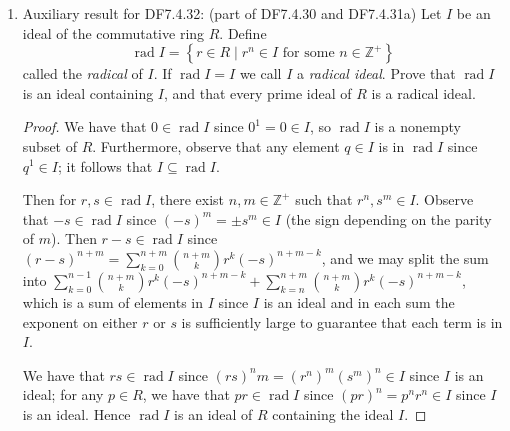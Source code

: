 \documentclass[11pt]{article}
\newcommand{\cbr}[1]{\left\{#1\right\}}
\DeclareMathOperator{\rad}{rad}
\begin{document}
\begin{enumerate}
    \item Auxiliary result for DF7.4.32: (part of DF7.4.30 and DF7.4.31a) Let $I$ be an ideal of the commutative ring $R$. Define \[\rad I = \cbr{r\in R\mid r^n\in I\text{ for some $n\in \mathbb{Z}^+$}}\] called the \textit{radical} of $I$. If $\rad I = I$ we call $I$ a \textit{radical ideal}. Prove that $\rad I$ is an ideal containing $I$, and that every prime ideal of $R$ is a radical ideal. 
    \begin{proof} We have that $0\in \rad I$ since $0^1 = 0\in I$, so $\rad I$ is a nonempty subset of $R$. Furthermore, observe that any element $q\in I$ is in $\rad I$ since $q^1 \in I$; it follows that $I\subseteq \rad I$.
      
    Then for $r,s\in \rad I$, there exist $n,m\in\mathbb{Z}^+$ such that $r^n, s^m\in I$. Observe that $-s\in\rad I$ since $(-s)^m = \pm s^m \in I$ (the sign depending on the parity of $m$). Then $r-s\in\rad I$ since $(r-s)^{n+m} = \sum_{k=0}^{n+m} \binom{n+m}{k}r^k(-s)^{n+m-k}$, and we may split the sum into $\sum_{k=0}^{n-1} \binom{n+m}{k}r^k(-s)^{n+m-k} + \sum_{k=n}^{n+m} \binom{n+m}{k}r^k(-s)^{n+m-k}$, which is a sum of elements in $I$ since $I$ is an ideal and in each sum the exponent on either $r$ or $s$ is sufficiently large to guarantee that each term is in $I$.
        
    We have that $rs\in \rad I$ since $(rs)^nm = (r^n)^m(s^m)^n \in I$ since $I$ is an ideal; for any $p\in R$, we have that $pr\in \rad I$ since $(pr)^n = p^n r^n \in I$ since $I$ is an ideal. Hence $\rad I$ is an ideal of $R$ containing the ideal $I$.


\end{proof}
\end{enumerate}
\end{document}
